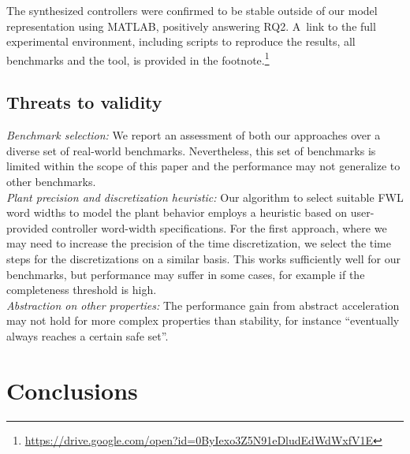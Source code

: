 \documentclass[runningheads,a4paper]{llncs}
\begin{document}
The synthesized controllers were confirmed to be stable outside of our model
representation using MATLAB, positively answering RQ2.  A~link to the full
experimental environment, including scripts to reproduce the results, all
benchmarks and the tool, is provided in the
footnote.\footnote{\url{https://drive.google.com/open?id=0ByIexo3Z5N91eDludEdWdWxfV1E}}


\subsection{Threats to validity}
\textit{Benchmark selection:} We report an assessment of both our approaches over a diverse set of real-world benchmarks. Nevertheless, this set of benchmarks is limited within the scope of this paper and the performance may not generalize to other benchmarks.\\ 
%
\textit{Plant precision and discretization heuristic:} Our algorithm to select suitable FWL word widths to model the plant behavior employs a heuristic based on user-provided controller word-width specifications. For the first approach, where we may need to increase the precision of the time discretization, we select the time steps for the discretizations on a similar basis. This works sufficiently well for our benchmarks, but performance may suffer in some cases, for example if the completeness threshold is high.\\ 
%
\textit{Abstraction on other properties:} The performance gain from abstract acceleration may not hold for more complex properties than stability, for instance ``eventually always reaches a certain safe set''. 





\section{Conclusions}
\end{document}
